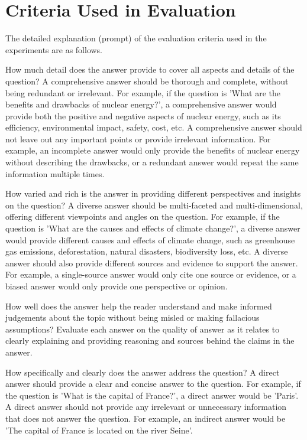 \section{Criteria Used in Evaluation}\label{sec:criteria_appendix}

The detailed explanation (prompt) of the evaluation criteria used in the experiments are as follows.

 How much detail does the answer provide to cover all aspects and details of the question? A comprehensive answer should be thorough and complete, without being redundant or irrelevant. For example, if the question is ’What are the benefits and drawbacks of nuclear energy?’, a comprehensive answer would provide both the positive and negative aspects of nuclear energy, such as its efficiency, environmental impact, safety, cost, etc. A comprehensive answer should not leave out any important points or provide irrelevant information. For example, an incomplete answer would only provide the benefits of nuclear energy without describing the drawbacks, or a redundant answer would repeat the same information multiple times.

 How varied and rich is the answer in providing different perspectives and insights on the question? A diverse answer should be multi-faceted and multi-dimensional, offering different viewpoints and angles on the question. For example, if the question is ’What are the causes and effects of climate change?’, a diverse answer would provide different causes and effects of climate change, such as greenhouse gas emissions, deforestation, natural disasters, biodiversity loss, etc. A diverse answer should also provide different sources and evidence to support the answer. For example, a single-source answer would only cite one source or evidence, or a biased answer would only provide one perspective or opinion.

 How well does the answer help the reader understand and make informed judgements about the topic without being misled or making fallacious assumptions? Evaluate each answer on the quality of answer as it relates to clearly explaining and providing reasoning and sources behind the claims in the answer.

 How specifically and clearly does the answer address the question? A direct answer should provide a clear and concise answer to the question. For example, if the question is ’What is the capital of France?’, a direct answer would be ’Paris’. A direct answer should not provide any irrelevant or unnecessary information that does not answer the question. For example, an indirect answer would be ’The capital of France is located on the river Seine’.
